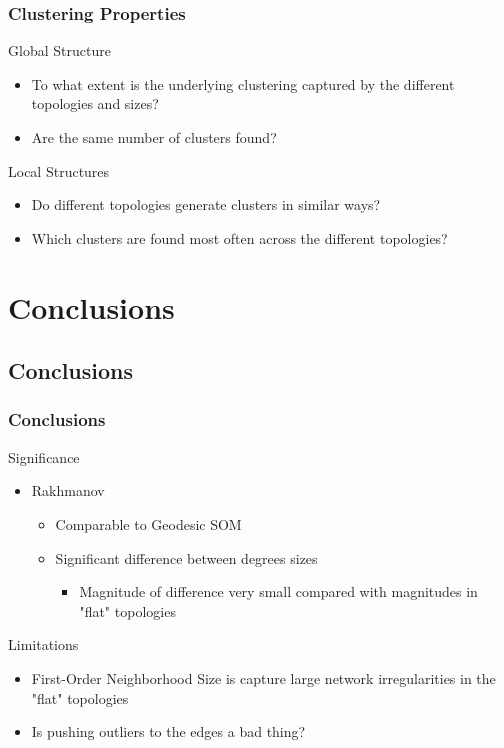 \documentclass[nototal,handout]{beamer}
\begin{document}
\begin{frame}
	\frametitle{Clustering Properties}
 
\begin{block}{Global Structure}
 \begin{itemize}
 \item To what extent is the underlying clustering captured by the different topologies and sizes?
 \item  Are the same number of clusters found?
 \end{itemize}
 \end{block} 
\begin{block}{Local Structures}
 \begin{itemize}
 \item  Do different topologies generate clusters in similar ways?
 \item  Which clusters are found most often across the different topologies?
 \end{itemize}
 \end{block} \end{frame} 


\section{Conclusions} 

\subsection{Conclusions} 

\begin{frame}
	\frametitle{Conclusions}
 
\begin{block}{Significance}
 \begin{itemize}
 \item  Rakhmanov 
 \begin{itemize}
 \item  Comparable to Geodesic SOM
 \item  Significant difference between degrees sizes
 \begin{itemize}
 \item  Magnitude of difference very small compared with magnitudes in "flat" topologies
 \end{itemize}
 \end{itemize}
 \end{itemize}
 \end{block} 
\begin{block}{Limitations}
 \begin{itemize}
 \item  First-Order Neighborhood Size is capture large network irregularities in the "flat" topologies
 \item  Is pushing outliers to the edges a bad thing?
 \end{itemize}
 \end{block} \end{frame}
\end{document}

